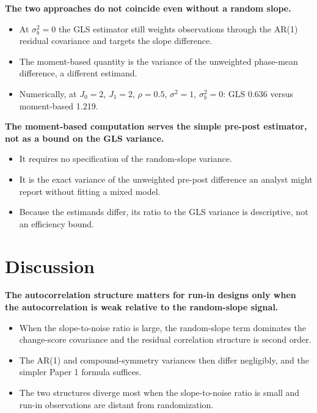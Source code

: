 \documentclass[
  11pt,
]{article}
\begin{document}
\textbf{The two approaches do not coincide even without a random slope.}

\begin{itemize}\setlength{\itemsep}{2pt}\setlength{\parskip}{0pt}
\item At $\sigma_b^2 = 0$ the GLS estimator still weights observations through the AR(1) residual covariance and targets the slope difference.
\item The moment-based quantity is the variance of the unweighted phase-mean difference, a different estimand.
\item Numerically, at $J_0 = 2$, $J_1 = 2$, $\rho = 0.5$, $\sigma^2 = 1$, $\sigma_b^2 = 0$: GLS 0.636 versus moment-based 1.219.
\end{itemize}

\textbf{The moment-based computation serves the simple pre-post estimator, not as a bound on the GLS variance.}

\begin{itemize}\setlength{\itemsep}{2pt}\setlength{\parskip}{0pt}
\item It requires no specification of the random-slope variance.
\item It is the exact variance of the unweighted pre-post difference an analyst might report without fitting a mixed model.
\item Because the estimands differ, its ratio to the GLS variance is descriptive, not an efficiency bound.
\end{itemize}

\section{Discussion}\label{discussion}

\textbf{The autocorrelation structure matters for run-in designs only when the autocorrelation is weak relative to the random-slope signal.}

\begin{itemize}\setlength{\itemsep}{2pt}\setlength{\parskip}{0pt}
\item When the slope-to-noise ratio is large, the random-slope term dominates the change-score covariance and the residual correlation structure is second order.
\item The AR(1) and compound-symmetry variances then differ negligibly, and the simpler Paper 1 formula suffices.
\item The two structures diverge most when the slope-to-noise ratio is small and run-in observations are distant from randomization.
\end{itemize}
\end{document}
